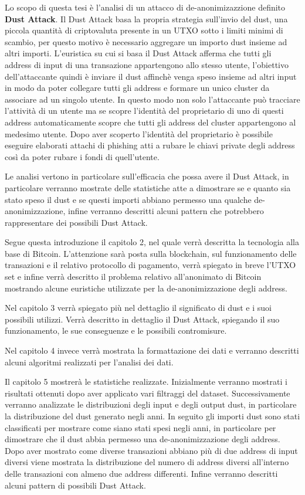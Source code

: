 Lo scopo di questa tesi è l'analisi di un attacco di de-anonimizazzione definito \textbf{Dust Attack}. Il Dust Attack basa la propria strategia sull'invio del dust, una piccola quantità di criptovaluta presente in un UTXO sotto i limiti minimi di scambio, per questo motivo è necessario aggregare un importo dust insieme ad altri importi. L'euristica su cui si basa il Dust Attack afferma che tutti gli address di input di una transazione appartengono allo stesso utente, l'obiettivo dell'attaccante quindi è inviare il dust affinchè venga speso insieme ad altri input in modo da poter collegare tutti gli address e formare un unico cluster da associare ad un singolo utente. In questo modo non solo l'attaccante può tracciare l'attività di un utente ma se scopre l'identità del proprietario di uno di questi address automaticamente scopre che tutti gli address del cluster appartengono al medesimo utente. Dopo aver scoperto l'identità del proprietario è possibile eseguire elaborati attachi di phishing atti a rubare le chiavi private degli address così da poter rubare i fondi di quell'utente.

Le analisi vertono in particolare sull'efficacia che possa avere il Dust Attack, in particolare verranno mostrate delle statistiche atte a dimostrare se e quanto sia stato speso il dust e se questi importi abbiano permesso una qualche de-anonimizzazione, infine verranno descritti alcuni pattern che potrebbero rappresentare dei possibili Dust Attack.

Segue questa introduzione il capitolo 2, nel quale verrà descritta la tecnologia alla base di Bitcoin. L'attenzione sarà posta sulla blockchain, sul funzionamento delle transazioni e il relativo protocollo di pagamento, verrà spiegato in breve l'UTXO set e infine verrà descritto il problema relativo all'anonimato di Bitcoin mostrando alcune euristiche utilizzate per la de-anonimizzazione degli address.

Nel capitolo 3 verrà spiegato più nel dettaglio il significato di dust e i suoi possibili utilizzi. Verrà descritto in dettaglio il Dust Attack, spiegando il suo funzionamento, le sue conseguenze e le possibili contromisure.

Nel capitolo 4 invece verrà mostrata la formattazione dei dati e verranno descritti alcuni algoritmi realizzati per l'analisi dei dati.

Il capitolo 5 mostrerà le statistiche realizzate. Inizialmente verranno mostrati i risultati ottenuti dopo aver applicato vari filtraggi del dataset. Successivamente verranno analizzate le distribuzioni degli input e degli output dust, in particolare la distribuzione del dust generato negli anni. In seguito gli importi dust sono stati classificati per mostrare come siano stati spesi negli anni, in particolare per dimostrare che il dust abbia permesso una de-anonimizzazione degli address. Dopo aver mostrato come diverse transazioni abbiano più di due address di input diversi viene mostrata la distribuzione del numero di address diversi all'interno delle transazioni con almeno due address differenti. Infine verranno descritti alcuni pattern di possibili Dust Attack.